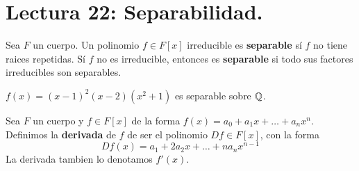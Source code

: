 \section*{Lectura 22: Separabilidad.}

\begin{definition}
    Sea $F$ un cuerpo. Un polinomio  $f \in F[x]$ irreducible es
    \textbf{separable} s\'i $f$ no tiene raices repetidas. S\'i  $f$ no es
    irreducible, entonces es  \textbf{separable} si todo sus factores
    irreducibles son separables.
\end{definition}

\begin{example}\label{}
    $f(x)=(x-1)^2(x-2)(x^2+1)$ es separable sobre $\mathbb{Q}$.
\end{example}

\begin{definition}
    Sea $F$ un cuerpo y  $f \in F[x]$ de la forma $f(x)=a_0+a_1x+\dots+a_nx^n$.
    Definimos la \textbf{derivada} de $f$ de ser el polinomio $D{f} \in F[x]$,
    con la forma
    \begin{equation*}
        D{f}(x)=a_1+2a_2x+\dots+na_nx^{n-1}
    \end{equation*}
    La derivada tambien lo denotamos $f'(x)$.
\end{definition}

